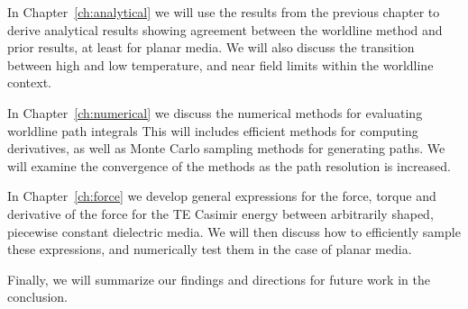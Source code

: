 In Chapter~\ref{ch:analytical} we will use the results from the previous chapter to derive analytical 
results showing agreement between the worldline method and prior results, at least for planar media.
We will also discuss the transition between high and low temperature, and near field limits within the
worldline context.  

In Chapter~\ref{ch:numerical} we discuss the numerical methods for evaluating worldline path integrals
This will includes efficient methods for computing derivatives, as well as Monte Carlo sampling methods
for generating paths.  We will examine the convergence of the methods as the path resolution is increased.

In Chapter~\ref{ch:force} we develop general expressions for the force, torque and derivative of the force 
for the TE Casimir energy between arbitrarily shaped, piecewise constant dielectric media.  
We will then discuss how to efficiently sample these expressions, and numerically test them in the case of planar media.  


Finally, we will summarize our findings and directions for future work in the conclusion.  


